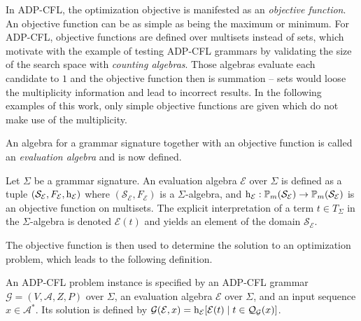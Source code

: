 \documentclass[
    a4paper,
    12pt,
    twoside,
    BCOR=12mm,
    parskip=half,
    chapterprefix,
    numbers=noenddot,
    bibliography=totoc
]{scrbook}
\begin{document}
In ADP-CFL, the optimization objective is manifested as an \emph{objective function}. An objective function can be as simple as being the maximum or minimum. For ADP-CFL, objective functions are defined over multisets instead of sets, which \citet[p. 49]{giegerich_discipline_2004} motivate with the example of testing ADP-CFL grammars by validating the size of the search space with \emph{counting algebras}. Those algebras evaluate each candidate to $1$ and the objective function then is summation -- sets would loose the multiplicity information and lead to incorrect results.
In the following examples of this work, only simple objective functions are given which do not make use of the multiplicity.

An algebra for a grammar signature together with an objective function is called an \emph{evaluation algebra} and is now defined.

\begin{definition}
	Let $\Sigma$ be a grammar signature. An evaluation algebra $\mathcal{E}$ over $\Sigma$ is defined as a tuple $(\mathcal{S}_\mathcal{E}, F_\mathcal{E}, \mathrm{h}_\mathcal{E})$ where $(\mathcal{S}_\mathcal{E}, F_\mathcal{E})$ is a $\Sigma$-algebra, and $\mathrm{h}_\mathcal{E} : \mathbb{P}_m(\mathcal{S_\mathcal{E}}) \to \mathbb{P}_m(\mathcal{S_\mathcal{E}})$ is an objective function on multisets.
  The explicit interpretation of a term $t \in T_\Sigma$ in the $\Sigma$-algebra is denoted $\mathcal{E}(t)$ and yields an element of the domain $\mathcal{S}_\mathcal{E}$.
\end{definition}

The objective function is then used to determine the solution to an optimization problem, which leads to the following definition.

\begin{definition}
	An ADP-CFL problem instance is specified by an ADP-CFL grammar $\mathcal{G}=(V,\mathcal{A},Z,\allowbreak P)$ over $\Sigma$, an evaluation algebra $\mathcal{E}$ over $\Sigma$, and an input sequence $x \in \mathcal{A}^*$. Its solution is defined by 
	$\mathcal{G}(\mathcal{E},x) = \mathrm{h}_\mathcal{E}[\mathcal{E}(t) \mid t \in \mathcal{Q}_\mathcal{G}(x)]$.
\end{definition}
\end{document}
